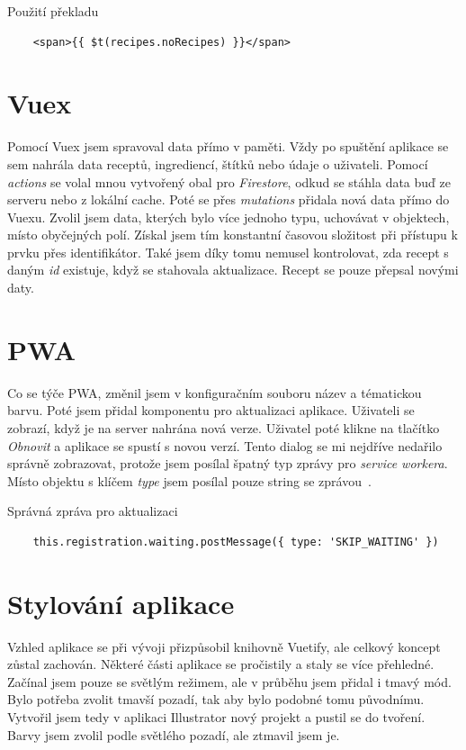 \begin{listing}[H]
    \caption{Použití překladu}
    \begin{verbatim}
    <span>{{ $t(recipes.noRecipes) }}</span>
    \end{verbatim}
\end{listing}

\section{Vuex}
Pomocí Vuex jsem spravoval data přímo v paměti. Vždy po spuštění aplikace se sem nahrála data receptů, ingrediencí, štítků
nebo údaje o uživateli. Pomocí \emph{actions} se volal mnou vytvořený obal pro \emph{Firestore}, odkud se stáhla data buď ze serveru
nebo z lokální cache. Poté se přes \emph{mutations} přidala nová data přímo do Vuexu. Zvolil jsem data, kterých bylo více jednoho typu,
uchovávat v objektech, místo obyčejných polí. Získal jsem tím konstantní časovou složitost při přístupu k prvku přes identifikátor. Také
jsem díky tomu nemusel kontrolovat, zda recept s daným \emph{id} existuje, když se stahovala aktualizace. Recept se pouze přepsal novými
daty.

\section{PWA}
Co se týče PWA, změnil jsem v konfiguračním souboru název a tématickou barvu. Poté jsem přidal komponentu pro aktualizaci aplikace.
Uživateli se zobrazí, když je na server nahrána nová verze. Uživatel poté klikne na tlačítko \emph{Obnovit} a aplikace se spustí s novou verzí.
Tento dialog se mi nejdříve nedařilo správně zobrazovat, protože jsem posílal špatný typ zprávy pro \emph{service workera}. Místo objektu s
klíčem \emph{type} jsem posílal pouze string se zprávou~\cite{PWAServiceWorker}.

\begin{listing}[h]
    \caption{Správná zpráva pro aktualizaci}
    \begin{verbatim}
    this.registration.waiting.postMessage({ type: 'SKIP_WAITING' })
    \end{verbatim}
\end{listing}

\section{Stylování aplikace}
Vzhled aplikace se při vývoji přizpůsobil knihovně Vuetify, ale celkový koncept zůstal zachován. Některé části aplikace
se pročistily a staly se více přehledné. Začínal jsem pouze se světlým režimem, ale v průběhu jsem přidal i tmavý mód.
Bylo potřeba zvolit tmavší pozadí, tak aby bylo podobné tomu původnímu. Vytvořil jsem tedy v aplikaci Illustrator nový projekt
a pustil se do tvoření. Barvy jsem zvolil podle světlého pozadí, ale ztmavil jsem je.

